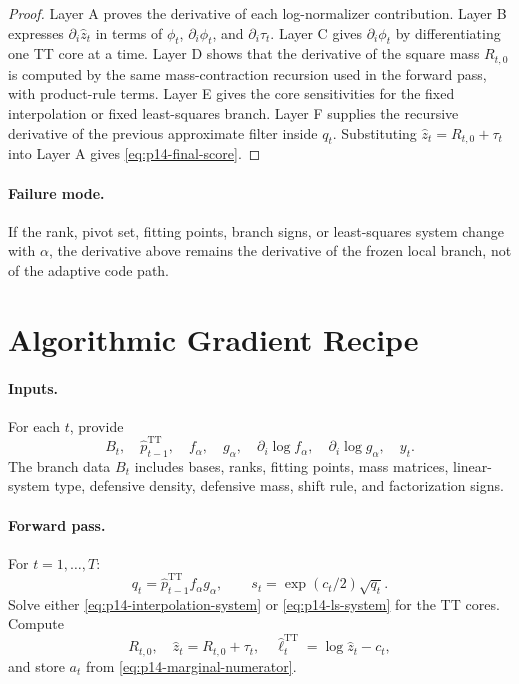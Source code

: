\documentclass[11pt]{article}
\newcommand{\TT}{\mathrm{TT}}
\renewcommand{\[}{\begin{equation}}
\renewcommand{\]}{\end{equation}}
\theoremstyle{definition}
\theoremstyle{remark}
\begin{document}
\begin{proof}
Layer A proves the derivative of each log-normalizer contribution.  Layer B
expresses \(\partial_i\widehat z_t\) in terms of
\(\phi_t\), \(\partial_i\phi_t\), and \(\partial_i\tau_t\).  Layer C gives
\(\partial_i\phi_t\) by differentiating one TT core at a time.  Layer D shows
that the derivative of the square mass \(R_{t,0}\) is computed by the same
mass-contraction recursion used in the forward pass, with product-rule terms.
Layer E gives the core sensitivities for the fixed interpolation or fixed
least-squares branch.  Layer F supplies the recursive derivative of the
previous approximate filter inside \(q_t\).  Substituting
\(\widehat z_t=R_{t,0}+\tau_t\) into Layer A gives
\eqref{eq:p14-final-score}.
\end{proof}

\paragraph{Failure mode.}
If the rank, pivot set, fitting points, branch signs, or least-squares system
change with \(\alpha\), the derivative above remains the derivative of the
frozen local branch, not of the adaptive code path.

\section{Algorithmic Gradient Recipe}

\paragraph{Inputs.}
For each \(t\), provide
\[
  B_t,\quad \widehat p_{t-1}^{\TT},\quad f_\alpha,\quad g_\alpha,\quad
  \partial_i\log f_\alpha,\quad \partial_i\log g_\alpha,\quad
  y_t.
\]
The branch data \(B_t\) includes bases, ranks, fitting points, mass matrices,
linear-system type, defensive density, defensive mass, shift rule, and
factorization signs.

\paragraph{Forward pass.}
For \(t=1,\ldots,T\):
\[
  q_t=\widehat p_{t-1}^{\TT}f_\alpha g_\alpha,
  \qquad
  s_t=\exp(c_t/2)\sqrt{q_t}.
\]
Solve either \eqref{eq:p14-interpolation-system} or
\eqref{eq:p14-ls-system} for the TT cores.  Compute
\[
  R_{t,0},\quad
  \widehat z_t=R_{t,0}+\tau_t,\quad
  \widehat\ell_t^{\TT}=\log\widehat z_t-c_t,
\]
and store \(a_t\) from \eqref{eq:p14-marginal-numerator}.
\end{document}
